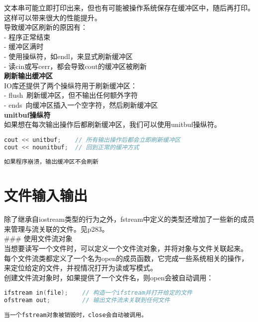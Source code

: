 \documentclass[
  a4paper,
  oneside,tablecaptionabove
]{scrbook}
\begin{document}
文本串可能立即打印出来，但也有可能被操作系统保存在缓冲区中，随后再打印。这样可以带来很大的性能提升。\\
导致缓冲区刷新的原因有：\\
- 程序正常结束\\
- 缓冲区满时\\
- 使用操纵符，如endl，来显式刷新缓冲区\\
- 读cin或写cerr，都会导致cout的缓冲区被刷新\\
\textbf{刷新输出缓冲区}\\
IO库还提供了两个操纵符用于刷新缓冲区：\\
- flush~刷新缓冲区，但不输出任何额外字符\\
- ends~向缓冲区插入一个空字符，然后刷新缓冲区\\
\textbf{unitbuf操纵符}\\
如果想在每次输出操作后都刷新缓冲区，我们可以使用unitbuf操纵符。

\begin{lstlisting}[language={C++}]
cout << unitbuf;    // 所有输出操作后都会立即刷新缓冲区
cout << nounitbuf;  // 回到正常的缓冲方式
\end{lstlisting}

\begin{lstlisting}
如果程序崩溃，输出缓冲区不会刷新  
\end{lstlisting}

\section{文件输入输出}\label{ux6587ux4ef6ux8f93ux5165ux8f93ux51fa}

除了继承自iostream类型的行为之外，fstream中定义的类型还增加了一些新的成员来管理与流关联的文件。见p283。\\
\#\#\# 使用文件流对象\\
当想要读写一个文件时，可以定义一个文件流对象，并将对象与文件关联起来。\\
每个文件流类都定义了一个名为open的成员函数，它完成一些系统相关的操作，来定位给定的文件，并视情况打开为读或写模式。\\
创建文件流对象时，如果提供了一个文件名，则open会被自动调用：

\begin{lstlisting}[language={C++}]
ifstream in(file);    // 构造一个ifstream并打开给定的文件
ofstream out;         // 输出文件流未关联到任何文件
\end{lstlisting}

\begin{lstlisting}
当一个fstream对象被销毁时，close会自动被调用。  
\end{lstlisting}
\end{document}
